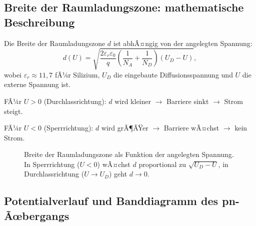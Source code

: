 ﻿\documentclass[12pt, a4paper]{article}
\begin{document}
	\subsection{Breite der Raumladungszone: mathematische Beschreibung}
	
	Die Breite der Raumladungszone $d$ ist abhÃ¤ngig von der angelegten Spannung:
	\begin{equation}
		d(U) = \sqrt{\frac{2\varepsilon_r \varepsilon_0}{q} \left(\frac{1}{N_A} +
			\frac{1}{N_D}\right)(U_D - U)},
		\label{eq:rlz_breite}
	\end{equation}
	wobei $\varepsilon_r \approx 11{,}7$ fÃ¼r Silizium, $U_D$ die eingebaute
	Diffusionsspannung und $U$ die externe Spannung ist.
	
	FÃ¼r $U > 0$ (Durchlassrichtung): $d$ wird kleiner $\to$ Barriere sinkt $\to$
	Strom steigt.
	
	FÃ¼r $U < 0$ (Sperrrichtung): $d$ wird grÃ¶ÃŸer $\to$ Barriere wÃ¤chst $\to$
	kein Strom.
	
	\begin{figure}[h]
		\centering
		\caption{Breite der Raumladungszone als Funktion der angelegten Spannung. In
			Sperrrichtung ($U < 0$) wÃ¤chst $d$ proportional zu $\sqrt{U_D - U}$, in
			Durchlassrichtung ($U \to U_D$) geht $d \to 0$.}
		\label{fig:rlz_breite}
	\end{figure}
	
	\subsection{Potentialverlauf und Banddiagramm des pn-Ãœbergangs}
	
\end{document}
